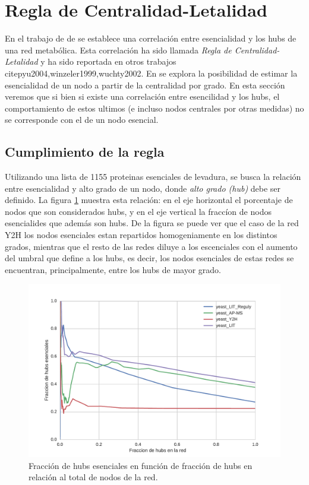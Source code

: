 \section{Regla de Centralidad-Letalidad \citep{jeong2000}\label{sec:jeong}}
En el trabajo de de \citet{jeong2000} se establece una correlaci\'on entre esencialidad y los hubs de una red metab\'olica. 
Esta correlaci\'on ha sido llamada \textit{Regla de Centralidad-Letalidad} y ha sido reportada en otros trabajos 
citep{yu2004,winzeler1999,wuchty2002}. En \citet{jeong2000} se explora la posibilidad de estimar la esencialidad de un
nodo a partir de la centralidad por grado. En esta secci\'on veremos que si bien si existe una correlaci\'on entre esencilidad y los hubs, el comportamiento de estos ultimos (e incluso nodos centrales por otras medidas) no se corresponde con el de un 
nodo esencial.

\subsection{Cumplimiento de la regla}
Utilizando una lista de 1155 proteinas esenciales de levadura, se busca la relaci\'on entre esencialidad y alto grado de un nodo, donde \textit{alto grado (hub)} debe ser definido. La figura \ref{fig:esshub} muestra esta relaci\'on: en el eje horizontal el 
porcentaje de nodos que son considerados hubs, y en el eje vertical la fracc\'ion de nodos esencialides que adem\'as son hubs. 
De la figura se puede ver que el caso de la red Y2H los nodos esenciales estan repartidos homogeniamente en los distintos grados, mientras que el resto de las redes diluye a los escenciales con el aumento del umbral que define a los hubs, es decir, los nodos 
esenciales de estas redes se encuentran, principalmente, entre los hubs de mayor grado.

\begin{figure}[!ht]
    \centering
    \includegraphics[width=.8\columnwidth]{./schemes/ess_hub.pdf}
    \caption{\label{fig:esshub} Fracci\'on de hubs esenciales en funci\'on de fracci\'on de hubs en relaci\'on al total de nodos de la red.  }
\end{figure}


